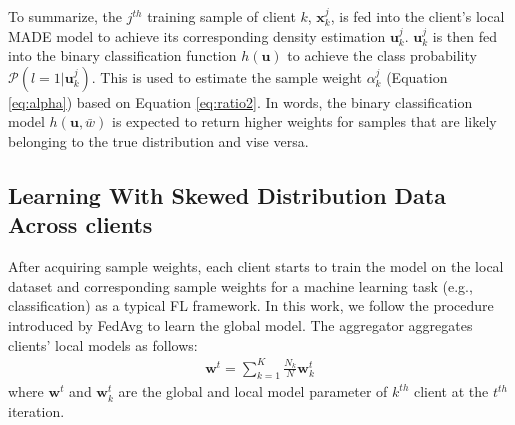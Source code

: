 \documentclass[journal]{IEEEtai}
\newcommand{\Prob}{\mathcal{P} }
\newcommand{\x}{\mathbf{x}}
\newcommand{\ubold}{\mathbf{u}}
\begin{document}
To summarize, the $j^{th}$ training sample of client $k$, $\x_k^j$, is fed into the client's local MADE model to achieve its corresponding density estimation $\ubold{}_k^j$. $\ubold{}_k^j$ is then fed into the binary classification function $h(\ubold)$ to achieve the class probability $ \Prob(l=1|\ubold_k^j ) $. This is used to estimate the sample weight $\alpha_k^j$ (Equation \ref{eq:alpha}) based on Equation \ref{eq:ratio2}. In words, the binary classification model $h(\ubold,\bar{w})$ is expected to return higher weights for samples that are likely belonging to the true distribution and vise versa. 

\subsection{Learning With Skewed Distribution Data Across clients }
After acquiring sample weights, each client starts to train the model on the local dataset and corresponding sample weights for a machine learning task (e.g., classification) as a typical FL framework. In this work, we follow the procedure introduced by FedAvg to learn the global model. The aggregator aggregates clients' local models as follows:
\begin{equation}
\begin{aligned}
\mathbf{w}^t = \sum_{k=1}^{K} \frac{N_k}{N} \mathbf{w}^t_k 
\end{aligned}
\end{equation}
where $\mathbf{w}^t$ and $\mathbf{w}^t_k$ are the global and local model parameter of $k^{th}$ client at the $t^{th}$ iteration.
\end{document}
